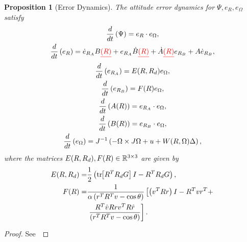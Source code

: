 \documentclass[10pt,fleqn]{IJCAS}  %
\newtheorem{prop}{Proposition}
\providecommand{\DIFdel}[1]{{\protect\color{red}\sout{#1}}}                      %
\providecommand{\DIFdelbegin}{} %
\providecommand{\DIFdelend}{} %
\begin{document}
\begin{multicols}{2}
\begin{prop}[Error Dynamics]\label{prop:error_dyn}
	The attitude error dynamics for \( \Psi, e_R, e_\Omega \) satisfy 
	\begin{gather}
		\diff{}{t} \parenth{\Psi} = e_R \cdot e_\Omega , \label{eqn:psi_dot}\\
		\diff{}{t} \parenth{e_R} = \dot{e}_{R_A} B \DIFdelbegin \DIFdel{(R) }\DIFdelend + e_{R_A} \dot{B} \DIFdelbegin \DIFdel{(R) }\DIFdelend + \dot{A}\DIFdelbegin \DIFdel{(R)}\DIFdelend e_{R_B} + A \dot{e}_{R_B} , \label{eqn:eR_dot} \\
		\diff{}{t} \parenth{e_{R_A}} = E(R, R_d) e_\Omega , \label{eqn:eRA_dot} \\
		\diff{}{t} \parenth{e_{R_B}} = F(R) e_\Omega , \label{eqn:eRB_dot} \\
    	\diff{}{t} \parenth{A(R)} = e_{R_A} \cdot e_\Omega , \label{eqn:A_dot} \\
		\diff{}{t} \parenth{B(R)} = e_{R_B} \cdot e_\Omega , \label{eqn:B_dot} \\
		\diff{}{t} \parenth{e_\Omega} = J^{-1} \parenth{-\Omega \times J \Omega + u + W(R, \Omega) \Delta} , \label{eqn:eW_dot}
	\end{gather}
	where the matrices \(E(R,R_d), F(R) \in \mathbb{R}^{3\times3} \) are given by
	\begin{align}
		E(R,R_d) = &\frac{1}{2} \left( \mathrm{tr}\negthickspace\left[ R^T R_d G \right]I - R^T R_d G \right) , \label{eqn:E} \\
		F(R) = &\frac{1}{\alpha \left( r^T R^T v - \cos \theta \right)} \left[\left( v^T R r \right) I - R^T v r^T + \right. \nonumber \\
		& \left. \frac{R^T \hat{v} R r v^T R \hat{r}}{\left( r^T R^T v - \cos \theta \right)}\right] . \label{eqn:F}
	\end{align}
\end{prop}
\begin{proof}
See~
\end{proof}


\end{multicols}
\end{document}
